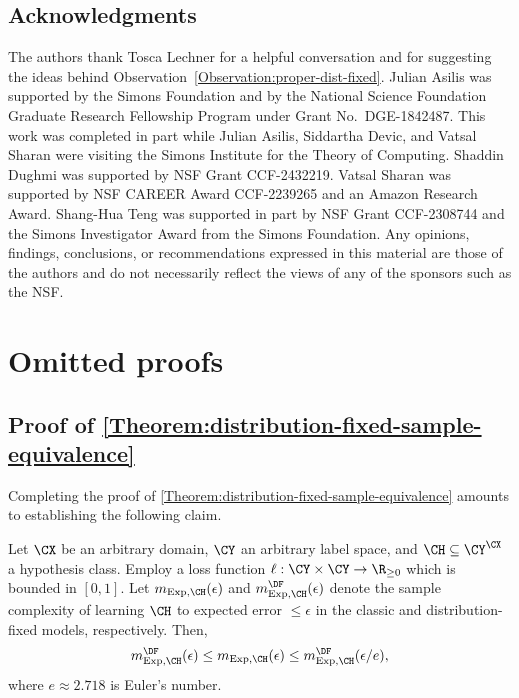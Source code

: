 \documentclass[11pt]{article}
\begin{document}
\subsection*{Acknowledgments}

\noindent The authors thank Tosca Lechner for a helpful conversation and for suggesting the ideas behind Observation~\ref{Observation:proper-dist-fixed}.
Julian Asilis was supported by the Simons Foundation and by the National Science Foundation Graduate Research Fellowship Program under Grant No.\ DGE-1842487. This work was completed in part while Julian Asilis, Siddartha Devic, and Vatsal Sharan were visiting the Simons Institute for the Theory of Computing.
Shaddin Dughmi was supported by NSF Grant CCF-2432219. Vatsal Sharan
was supported by NSF CAREER Award CCF-2239265 and an Amazon Research Award. Shang-Hua
Teng was supported in part by NSF Grant CCF-2308744 and the Simons Investigator Award from
the Simons Foundation. Any opinions, findings, conclusions, or recommendations expressed in this
material are those of the authors and do not necessarily reflect the views of any of the sponsors such
as the NSF. 


\newpage 


\newpage 

\appendix


\section{Omitted proofs}

\subsection{Proof of \cref{Theorem:distribution-fixed-sample-equivalence}}\label{Appendix:proof-of-distribution-fixed-sample-equivalence}

\noindent Completing the proof of \cref{Theorem:distribution-fixed-sample-equivalence} amounts to establishing the following claim. 

\begin{lemma}\label{Lemma:appendix}
Let $\CX$ be an arbitrary domain, $\CY$ an arbitrary label space, and $\CH \subseteq \CY^\CX$ a hypothesis class. Employ a loss function $\ell : \CY \times \CY \to \R_{\geq 0}$ which is bounded in $[0, 1]$. Let $m_{\Exp, \CH}(\epsilon)$ and $m_{\Exp, \CH}^{\DF}(\epsilon)$ denote the sample complexity of learning $\CH$ to expected error $\leq \epsilon$ in the classic and distribution-fixed models, respectively. Then, 
\[ m_{\Exp, \CH}^{\DF}(\epsilon) \leq m_{\Exp, \CH}(\epsilon) \leq m_{\Exp, \CH}^{\DF}(\epsilon / e), \]
where $e \approx 2.718$ is Euler's number. 
\end{lemma}
\end{document}

